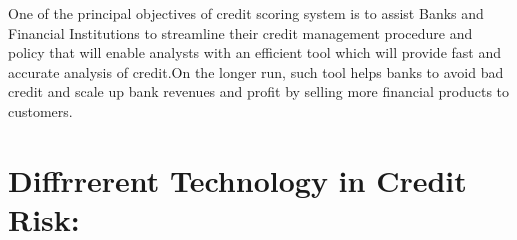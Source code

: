 {One of the principal objectives of credit scoring system is to assist Banks and Financial Institutions to streamline their credit management procedure and policy that will enable analysts with an efficient tool which will provide fast and accurate analysis of credit.On the longer run, such tool helps banks to avoid bad credit and scale up bank revenues and profit by selling more financial products to customers.\\

\section{Diffrrerent Technology in Credit Risk:}\label{c3.tech}



}
